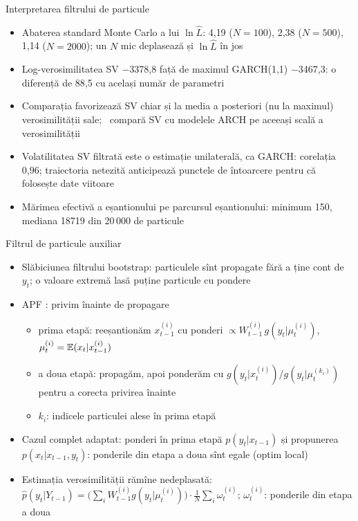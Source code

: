 \begin{frame}{Interpretarea filtrului de particule}
\itemsize{\footnotesize}
\begin{itemize}
    \item Abaterea standard Monte Carlo a lui $\ln\hat L$: 4{,}19 ($N = 100$), 2{,}38 ($N = 500$), 1{,}14 ($N = 2000$); un $N$ mic deplasează și $\ln\hat L$ în jos
    \item Log-verosimilitatea SV \ensuremath{-}3378{,}8 față de maximul GARCH(1,1) \ensuremath{-}3467{,}3: o diferență de 88{,}5 cu același număr de parametri
    \item Comparația favorizează SV chiar și la media a posteriori (nu la maximul) verosimilității sale; \ compară SV cu modelele ARCH pe aceeași scală a verosimilității
    \item Volatilitatea SV filtrată este o estimație unilaterală, ca GARCH: corelația 0{,}96; traiectoria netezită anticipează punctele de întoarcere pentru că folosește date viitoare
    \item Mărimea efectivă a eșantionului pe parcursul eșantionului: minimum 150, mediana 18719 din 20\,000 de particule
\end{itemize}
\end{frame}

\begin{frame}{Filtrul de particule auxiliar}
\itemsize{\small}
\begin{itemize}
    \item Slăbiciunea filtrului bootstrap: particulele sînt propagate fără a ține cont de $y_t$; o valoare extremă lasă puține particule cu pondere
    \item APF : privim înainte de propagare
    \begin{itemize}
        \item prima etapă: reeșantionăm $x^{(i)}_{t-1}$ cu ponderi $\propto W^{(i)}_{t-1}\,g(y_t | \mu^{(i)}_t)$, $\mu^{(i)}_t = \mathbb{E}(x_t | x^{(i)}_{t-1})$
        \item a doua etapă: propagăm, apoi ponderăm cu $g(y_t | x^{(i)}_t)/g(y_t | \mu^{(k_i)}_t)$ pentru a corecta privirea înainte
        \item $k_i$: indicele particulei alese în prima etapă
    \end{itemize}
    \item Cazul complet adaptat: ponderi în prima etapă $p(y_t | x_{t-1})$ și propunerea $p(x_t | x_{t-1}, y_t)$: ponderile din etapa a doua sînt egale (optim local)
    \item Estimația verosimilității rămîne nedeplasată: $\hat p(y_t | Y_{t-1}) = \big(\sum_iW^{(i)}_{t-1}g(y_t | \mu^{(i)}_t)\big)\cdot\frac1N\sum_i\omega^{(i)}_t$; $\omega^{(i)}_t$: ponderile din etapa a doua
\end{itemize}
\end{frame}

